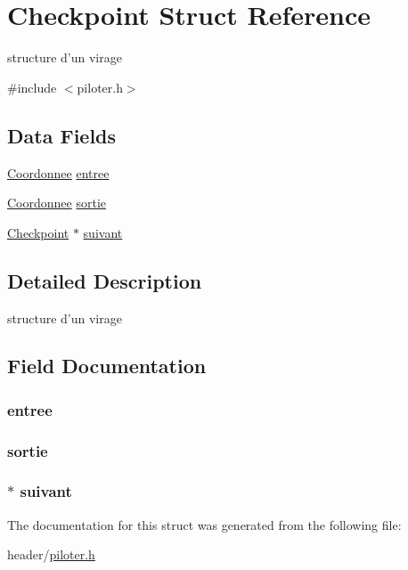 \hypertarget{struct_checkpoint}{\section{Checkpoint Struct Reference}
\label{struct_checkpoint}
}


structure d'un virage  




{\ttfamily \#include $<$piloter.\-h$>$}

\subsection*{Data Fields}
\begin{DoxyCompactItemize}
\item 
\hyperlink{struct_coordonnee}{Coordonnee} \hyperlink{struct_checkpoint_ad7acd034e660315325d75312d358adb1}{entree}
\item 
\hyperlink{struct_coordonnee}{Coordonnee} \hyperlink{struct_checkpoint_a5fa72ab77b124c97a4139fe8d2e8f28b}{sortie}
\item 
\hyperlink{struct_checkpoint}{Checkpoint} $\ast$ \hyperlink{struct_checkpoint_aae80a3c2f4be367e4a063084d1fd2f21}{suivant}
\end{DoxyCompactItemize}


\subsection{Detailed Description}
structure d'un virage 

\subsection{Field Documentation}
\hypertarget{struct_checkpoint_ad7acd034e660315325d75312d358adb1}{
\subsubsection[{entree}]{ entree}}\label{struct_checkpoint_ad7acd034e660315325d75312d358adb1}
\hypertarget{struct_checkpoint_a5fa72ab77b124c97a4139fe8d2e8f28b}{
\subsubsection[{sortie}]{ sortie}}\label{struct_checkpoint_a5fa72ab77b124c97a4139fe8d2e8f28b}
\hypertarget{struct_checkpoint_aae80a3c2f4be367e4a063084d1fd2f21}{
\subsubsection[{suivant}]{$\ast$ suivant}}\label{struct_checkpoint_aae80a3c2f4be367e4a063084d1fd2f21}


The documentation for this struct was generated from the following file\-:\begin{DoxyCompactItemize}
\item 
header/\hyperlink{piloter_8h}{piloter.\-h}\end{DoxyCompactItemize}
